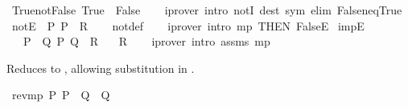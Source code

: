 \begin{isabellebody}
\endisatagproof
{\isafoldproof}%
%
\isadelimproof
\isanewline
%
\endisadelimproof
\isanewline
{}\isamarkupfalse%
\ True{\isacharunderscore}{\kern0pt}not{\isacharunderscore}{\kern0pt}False{\isacharcolon}{\kern0pt}\ {\isachardoublequoteopen}True\ {\isasymnoteq}\ False{\isachardoublequoteclose}\isanewline
%
\isadelimproof
\ \ %
\endisadelimproof
%
\isatagproof
{}\isamarkupfalse%
\ {\isacharparenleft}{\kern0pt}iprover\ intro{\isacharcolon}{\kern0pt}\ notI\ dest{\isacharcolon}{\kern0pt}\ sym\ elim{\isacharcolon}{\kern0pt}\ False{\isacharunderscore}{\kern0pt}neq{\isacharunderscore}{\kern0pt}True{\isacharparenright}{\kern0pt}%
\endisatagproof
{\isafoldproof}%
%
\isadelimproof
\isanewline
%
\endisadelimproof
\isanewline
{}\isamarkupfalse%
\ notE{\isacharcolon}{\kern0pt}\ {\isachardoublequoteopen}{\isasymlbrakk}{\isasymnot}\ P{\isacharsemicolon}{\kern0pt}\ P{\isasymrbrakk}\ {\isasymLongrightarrow}\ R{\isachardoublequoteclose}\isanewline
%
\isadelimproof
\ \ %
\endisadelimproof
%
\isatagproof
{}\isamarkupfalse%
\ not{\isacharunderscore}{\kern0pt}def\isanewline
\ \ \isamarkupfalse%
\ {\isacharparenleft}{\kern0pt}iprover\ intro{\isacharcolon}{\kern0pt}\ mp\ {\isacharbrackleft}{\kern0pt}THEN\ FalseE{\isacharbrackright}{\kern0pt}{\isacharparenright}{\kern0pt}%
\endisatagproof
{\isafoldproof}%
%
\isadelimproof
%
\endisadelimproof
%
\isadelimdocument
%
\endisadelimdocument
%
\isatagdocument
%
\isamarkuptrue%
%
\endisatagdocument
{\isafolddocument}%
%
\isadelimdocument
%
\endisadelimdocument
{}\isamarkupfalse%
\ impE{\isacharcolon}{\kern0pt}\isanewline
\ \ \ {\isachardoublequoteopen}P\ {\isasymlongrightarrow}\ Q{\isachardoublequoteclose}\ P\ {\isachardoublequoteopen}Q\ {\isasymLongrightarrow}\ R{\isachardoublequoteclose}\isanewline
\ \ \ R\isanewline
%
\isadelimproof
\ \ %
\endisadelimproof
%
\isatagproof
{}\isamarkupfalse%
\ {\isacharparenleft}{\kern0pt}iprover\ intro{\isacharcolon}{\kern0pt}\ assms\ mp{\isacharparenright}{\kern0pt}%
\endisatagproof
{\isafoldproof}%
%
\isadelimproof
%
\endisadelimproof
%
\begin{isamarkuptext}%
Reduces  to , allowing substitution in .%
\end{isamarkuptext}\isamarkuptrue%
\isamarkupfalse%
\ rev{\isacharunderscore}{\kern0pt}mp{\isacharcolon}{\kern0pt}\ {\isachardoublequoteopen}{\isasymlbrakk}P{\isacharsemicolon}{\kern0pt}\ P\ {\isasymlongrightarrow}\ Q{\isasymrbrakk}\ {\isasymLongrightarrow}\ Q{\isachardoublequoteclose}\isanewline

\end{isabellebody}
